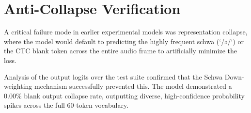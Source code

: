 \section{Anti-Collapse Verification}
A critical failure mode in earlier experimental models was representation collapse, where the model would default to predicting the highly frequent schwa (`/ə/`) or the CTC blank token across the entire audio frame to artificially minimize the loss.

Analysis of the output logits over the test suite confirmed that the Schwa Down-weighting mechanism successfully prevented this. The model demonstrated a 0.00\% blank output collapse rate, outputting diverse, high-confidence probability spikes across the full 60-token vocabulary.

